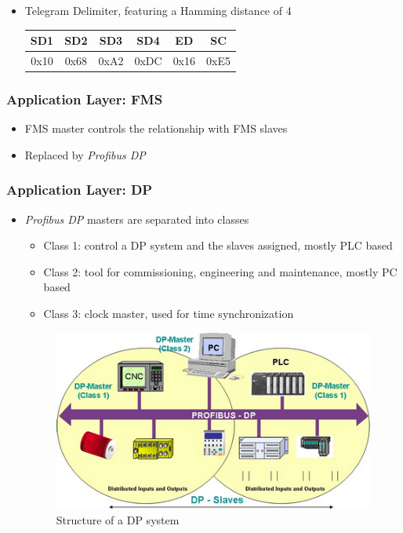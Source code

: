 \documentclass{beamer}
\begin{document}
\begin{frame}
\begin{itemize}
      \hfill \\
    \item Telegram Delimiter, featuring a Hamming distance of 4 \\
      \footnotesize
      \begin{tabular}[h]{|c|c|c|c|c|c|}
        \hline
        SD1   & SD2   & SD3   & SD4   & ED    & SC \\
        \hline
        0x10  & 0x68  & 0xA2  & 0xDC  & 0x16  & 0xE5 \\
        \hline
      \end{tabular}
      \normalsize
  \end{itemize}
\end{frame}

\begin{frame}
  \frametitle{Application Layer: FMS}
  \begin{itemize}
    \item FMS master controls the relationship with FMS slaves
    \item Replaced by \textit{Profibus DP}
  \end{itemize}
\end{frame}

\begin{frame}
  \frametitle{Application Layer: DP}
  \begin{itemize}
    \item \textit{Profibus DP} masters are separated into classes
      \begin{itemize}
        \item Class 1: control a DP system and the slaves assigned, mostly PLC based
        \item Class 2: tool for commissioning, engineering and maintenance, mostly PC
          based
        \item Class 3: clock master, used for time synchronization
      \end{itemize}
      \center
      \begin{figure}
        \includegraphics[width=.50\textwidth]{img/dp_system.png}
        \caption{Structure of a DP system~\cite{profibusmanual}}
      \end{figure}
  \end{itemize}
\end{frame}
\end{document}
